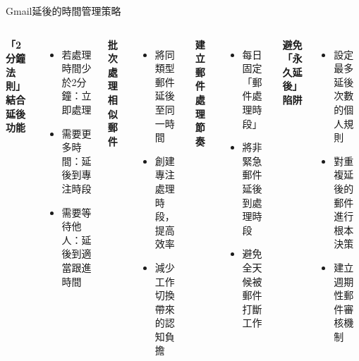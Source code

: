 \documentclass[aspectratio=169]{beamer}
\begin{document}
\begin{frame}{Gmail延後的時間管理策略}
  \begin{columns}
    \textbf{「2分鐘法則」結合延後功能}
    \begin{itemize}
      \item 若處理時間少於2分鐘：立即處理
      \item 需要更多時間：延後到專注時段
      \item 需要等待他人：延後到適當跟進時間
    \end{itemize}
    
    \textbf{批次處理相似郵件}
    \begin{itemize}
      \item 將同類型郵件延後至同一時間
      \item 創建專注處理時段，提高效率
      \item 減少工作切換帶來的認知負擔
    \end{itemize}
    
    \textbf{建立郵件處理節奏}
    \begin{itemize}
      \item 每日固定「郵件處理時段」
      \item 將非緊急郵件延後到處理時段
      \item 避免全天候被郵件打斷工作
    \end{itemize}
    
    \textbf{避免「永久延後」陷阱}
    \begin{itemize}
      \item 設定最多延後次數的個人規則
      \item 對重複延後的郵件進行根本決策
      \item 建立週期性郵件審核機制
    \end{itemize}
  \end{columns}
\end{frame}
\end{document}
